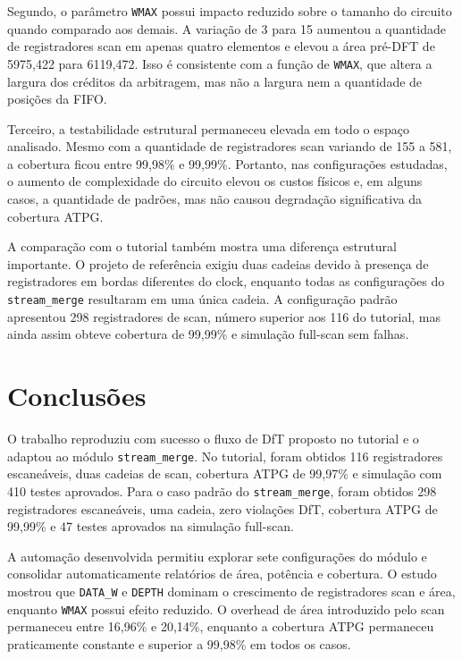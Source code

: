 \documentclass[conference]{IEEEtran}
\begin{document}
Segundo, o parâmetro \texttt{WMAX} possui impacto reduzido sobre o tamanho do circuito quando comparado aos demais. A variação de 3 para 15 aumentou a quantidade de registradores scan em apenas quatro elementos e elevou a área pré-DFT de 5975,422 para 6119,472. Isso é consistente com a função de \texttt{WMAX}, que altera a largura dos créditos da arbitragem, mas não a largura nem a quantidade de posições da FIFO.

Terceiro, a testabilidade estrutural permaneceu elevada em todo o espaço analisado. Mesmo com a quantidade de registradores scan variando de 155 a 581, a cobertura ficou entre 99,98\% e 99,99\%. Portanto, nas configurações estudadas, o aumento de complexidade do circuito elevou os custos físicos e, em alguns casos, a quantidade de padrões, mas não causou degradação significativa da cobertura ATPG.

A comparação com o tutorial também mostra uma diferença estrutural importante. O projeto de referência exigiu duas cadeias devido à presença de registradores em bordas diferentes do clock, enquanto todas as configurações do \texttt{stream\_merge} resultaram em uma única cadeia. A configuração padrão apresentou 298 registradores de scan, número superior aos 116 do tutorial, mas ainda assim obteve cobertura de 99,99\% e simulação full-scan sem falhas.

\section{Conclusões}
O trabalho reproduziu com sucesso o fluxo de DfT proposto no tutorial e o adaptou ao módulo \texttt{stream\_merge}. No tutorial, foram obtidos 116 registradores escaneáveis, duas cadeias de scan, cobertura ATPG de 99,97\% e simulação com 410 testes aprovados. Para o caso padrão do \texttt{stream\_merge}, foram obtidos 298 registradores escaneáveis, uma cadeia, zero violações DfT, cobertura ATPG de 99,99\% e 47 testes aprovados na simulação full-scan.

A automação desenvolvida permitiu explorar sete configurações do módulo e consolidar automaticamente relatórios de área, potência e cobertura. O estudo mostrou que \texttt{DATA\_W} e \texttt{DEPTH} dominam o crescimento de registradores scan e área, enquanto \texttt{WMAX} possui efeito reduzido. O overhead de área introduzido pelo scan permaneceu entre 16,96\% e 20,14\%, enquanto a cobertura ATPG permaneceu praticamente constante e superior a 99,98\% em todos os casos.
\end{document}
